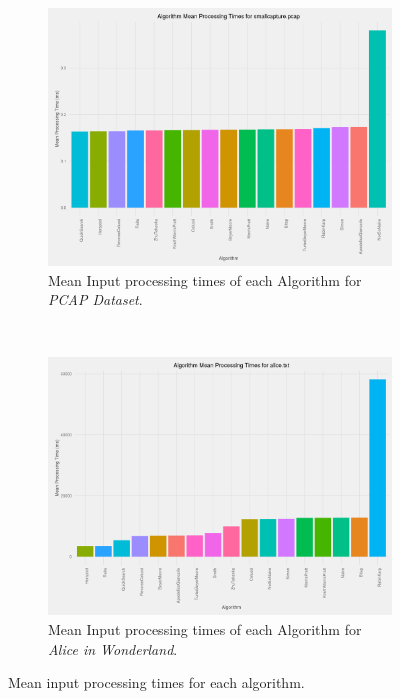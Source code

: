 \documentclass[11pt]{article}
\begin{document}
\begin{figure}[!htb]
    \centering
    \begin{subfigure}[b]{0.8\textwidth}
        \centering
        \includegraphics[width=\textwidth]{images/bar_graph_mean_one_input_smallcapture_pcap}
        \caption{Mean Input processing times of each Algorithm for \textit{PCAP Dataset}.}
        \label{figure-barmeanprocessingsmallcapture}
    \end{subfigure}
    ~
    \begin{subfigure}[b]{0.8\textwidth}
        \centering
        \includegraphics[width=\textwidth]{images/bar_graph_mean_one_input_alice_txt} 
        \caption{Mean Input processing times of each Algorithm for \textit{Alice in Wonderland}.}
        \label{figure-barmeanprocessingalice}
    \end{subfigure}
    \caption{Mean input processing times for each algorithm.}
\end{figure}
\end{document}

